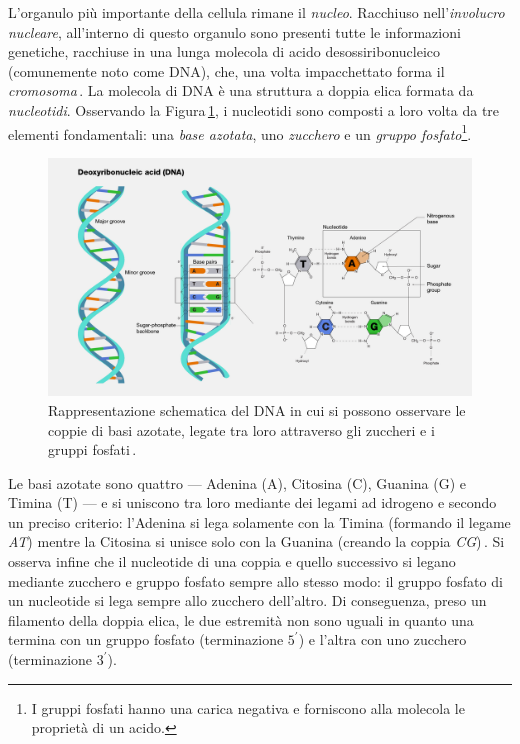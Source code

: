L'organulo più importante della cellula rimane il \textsl{nucleo}. Racchiuso nell'\textsl{involucro nucleare}, all'interno di questo organulo sono presenti tutte le informazioni genetiche, racchiuse in una lunga molecola di acido desossiribonucleico (comunemente noto come \acs{DNA}), che, una volta impacchettato forma il \textsl{cromosoma}\,\cite{pollard2022cell, alberts2015essential}. La molecola di \acs{DNA} è una struttura a doppia elica formata da \textsl{nucleotidi}. Osservando la Figura\,\ref{fig:dna}, i nucleotidi sono composti a loro volta da tre elementi fondamentali: una \textsl{base azotata}, uno \textsl{zucchero} e un \textsl{gruppo fosfato}\footnote{I gruppi fosfati hanno una carica negativa e forniscono alla molecola le proprietà di un acido.}.
% 
\begin{figure}[b!]
    \centering
    \includegraphics[width=\textwidth]{assets/imgs/dna.jpg}
    \caption[Rappresentazione schematica del \acs{DNA}.]{Rappresentazione schematica del \acs{DNA} in cui si possono osservare le coppie di basi azotate, legate tra loro attraverso gli zuccheri e i gruppi fosfati\,\cite{nhgri_dna_image}.}\label{fig:dna}
\end{figure}
% 
Le basi azotate sono quattro — Adenina (A), Citosina (C), Guanina (G) e Timina (T) — e si uniscono tra loro mediante dei legami ad idrogeno e secondo un preciso criterio: l'Adenina si lega solamente con la Timina (formando il legame \textit{AT}) mentre la Citosina si unisce solo con la Guanina (creando la coppia \textit{CG})\,\cite{fonseca2000hydrogen, sahu2011identification}. Si osserva infine che il nucleotide di una coppia e quello successivo si legano mediante zucchero e gruppo fosfato sempre allo stesso modo: il gruppo fosfato di un nucleotide si lega sempre allo zucchero dell'altro. Di conseguenza, preso un filamento della doppia elica, le due estremità non sono uguali in quanto una termina con un gruppo fosfato (terminazione $5^\prime$) e l'altra con uno zucchero (terminazione $3^\prime$).

